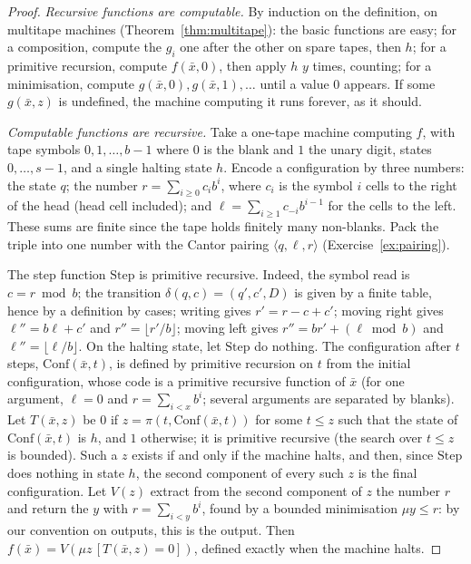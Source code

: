 \begin{proof}
\emph{Recursive functions are computable.} By induction on the definition, on multitape machines (Theorem~\ref{thm:multitape}): the basic functions are easy; for a composition, compute the $g_i$ one after the other on spare tapes, then $h$; for a primitive recursion, compute $f(\bar x,0)$, then apply $h$ $y$ times, counting; for a minimisation, compute $g(\bar x,0),g(\bar x,1),\dots$ until a value $0$ appears. If some $g(\bar x,z)$ is undefined, the machine computing it runs forever, as it should.

\emph{Computable functions are recursive.} Take a one-tape machine computing $f$, with tape symbols $0,1,\dots,b-1$ where $0$ is the blank and $1$ the unary digit, states $0,\dots,s-1$, and a single halting state $h$. Encode a configuration by three numbers: the state $q$; the number $r=\sum_{i\ge0}c_{i}b^{i}$, where $c_i$ is the symbol $i$ cells to the right of the head (head cell included); and $\ell=\sum_{i\ge1}c_{-i}b^{i-1}$ for the cells to the left. These sums are finite since the tape holds finitely many non-blanks. Pack the triple into one number with the Cantor pairing $\langle q,\ell,r\rangle$ (Exercise~\ref{ex:pairing}).

The step function $\mathrm{Step}$ is primitive recursive. Indeed, the symbol read is $c=r\bmod b$; the transition $\delta(q,c)=(q',c',D)$ is given by a finite table, hence by a definition by cases; writing gives $r'=r-c+c'$; moving right gives $\ell''=b\ell+c'$ and $r''=\lfloor r'/b\rfloor$; moving left gives $r''=br'+(\ell\bmod b)$ and $\ell''=\lfloor\ell/b\rfloor$. On the halting state, let $\mathrm{Step}$ do nothing. The configuration after $t$ steps, $\mathrm{Conf}(\bar x,t)$, is defined by primitive recursion on $t$ from the initial configuration, whose code is a primitive recursive function of $\bar x$ (for one argument, $\ell=0$ and $r=\sum_{i<x}b^i$; several arguments are separated by blanks). Let $T(\bar x,z)$ be $0$ if $z=\pi(t,\mathrm{Conf}(\bar x,t))$ for some $t\le z$ such that the state of $\mathrm{Conf}(\bar x,t)$ is $h$, and $1$ otherwise; it is primitive recursive (the search over $t\le z$ is bounded). Such a $z$ exists if and only if the machine halts, and then, since $\mathrm{Step}$ does nothing in state $h$, the second component of every such $z$ is the final configuration. Let $V(z)$ extract from the second component of $z$ the number $r$ and return the $y$ with $r=\sum_{i<y}b^i$, found by a bounded minimisation $\mu y\le r$: by our convention on outputs, this is the output. Then $f(\bar x)=V(\mu z\,[T(\bar x,z)=0])$, defined exactly when the machine halts.
\end{proof}

